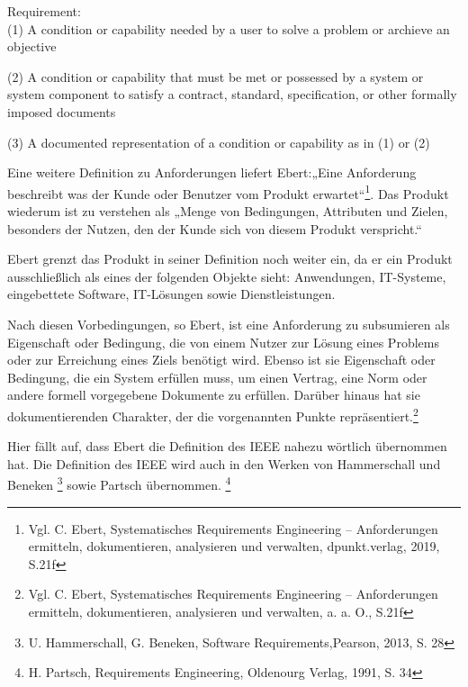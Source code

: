 %
%
%
%
\begin{itshape} %

Requirement:\\
(1)	A condition or capability needed by a user to solve a problem or archieve an objective 

(2)	A condition or capability that must be met or possessed by a system or system component to satisfy a contract, standard, specification, or other formally imposed documents

(3)	A documented representation of a condition or capability as in (1) or (2)


\end{itshape}

Eine weitere Definition zu Anforderungen liefert Ebert:„Eine Anforderung beschreibt was der Kunde oder Benutzer vom Produkt erwartet“\footnote{Vgl. C. Ebert, Systematisches Requirements Engineering – Anforderungen ermitteln, dokumentieren, analysieren und verwalten, dpunkt.verlag, 2019, S.21f}. Das Produkt wiederum ist zu verstehen als „Menge von Bedingungen, Attributen und Zielen, besonders der Nutzen, den der Kunde sich von diesem Produkt verspricht.“ 

Ebert grenzt das Produkt in seiner Definition noch weiter ein, da er ein Produkt ausschließlich als eines der folgenden Objekte sieht: Anwendungen, IT-Systeme, eingebettete Software, IT-Lösungen sowie Dienstleistungen.

Nach diesen Vorbedingungen, so Ebert, ist eine Anforderung zu subsumieren als Eigenschaft oder Bedingung, die von einem Nutzer zur Lösung eines Problems oder zur Erreichung eines Ziels benötigt wird. Ebenso ist sie Eigenschaft oder Bedingung, die ein System erfüllen muss, um einen Vertrag, eine Norm oder andere formell vorgegebene Dokumente zu erfüllen. Darüber hinaus hat sie dokumentierenden Charakter, der die vorgenannten Punkte repräsentiert.\footnote{ Vgl. C. Ebert, Systematisches Requirements Engineering – Anforderungen ermitteln, dokumentieren, analysieren und verwalten, a. a. O., S.21f}

Hier fällt auf, dass Ebert die Definition des IEEE nahezu wörtlich übernommen hat.
Die Definition des IEEE wird auch in den Werken von Hammerschall und Beneken \footnote{U. Hammerschall, G. Beneken, Software Requirements,Pearson, 2013, S. 28} sowie Partsch übernommen. \footnote{H. Partsch, Requirements Engineering, Oldenourg Verlag, 1991, S. 34 }

